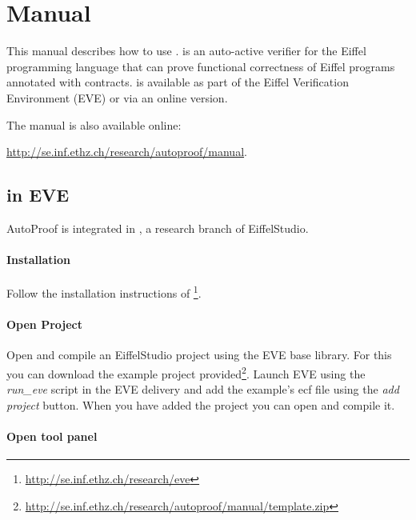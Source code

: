 \chapter{\AutoProof Manual}
\label{sec:ap-manual}

    This manual describes how to use \AutoProof. \AutoProof is an auto-active verifier for the 
    Eiffel programming language that can prove functional correctness of Eiffel programs annotated with contracts.
	\AutoProof is available as part of the Eiffel Verification Environment (EVE) or via an online version.

The manual is also available online:
\begin{center}
\url{http://se.inf.ethz.ch/research/autoproof/manual}.
\end{center}


\section{\AutoProof in EVE}

    AutoProof is integrated in \EVE, a research branch of EiffelStudio.

\subsubsection{Installation}

    Follow the installation instructions of \EVE\footnote{\url{http://se.inf.ethz.ch/research/eve}}.

\subsubsection{Open Project}

    Open and compile an EiffelStudio project using the EVE base library. For this you can download the example project provided\footnote{\url{http://se.inf.ethz.ch/research/autoproof/manual/template.zip}}. Launch EVE using the \emph{run\_eve} script in the EVE delivery and add the example's ecf file using the \emph{add project} button. When you have added the project you can open and compile it.


\subsubsection{Open \AutoProof tool panel}

